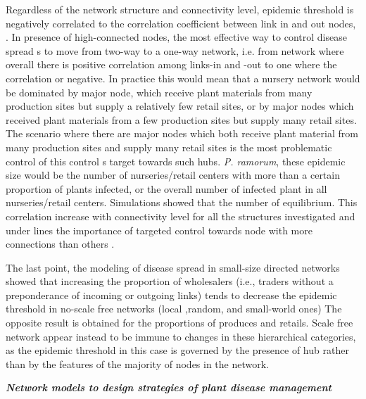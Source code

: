 Regardless of the network structure and connectivity level, epidemic threshold is negatively correlated to the correlation coefficient between link in and out nodes, . In presence of high-connected nodes, the most effective way to control disease spread s to move from two-way to a one-way network, i.e. from network where overall there is positive correlation among links-in and -out to one where the correlation or negative. In practice this would mean that a nursery network would be dominated by major node, which receive plant materials from many production sites but supply a relatively few retail sites, or by major nodes which received plant materials from a few production sites but supply many retail sites. The scenario where there are major nodes which both receive plant material from many production sites and supply many retail sites is the most problematic control of this control s target towards such hubs. \textit{P. ramorum}, these epidemic size would be the number of nurseries/retail centers with more than a certain proportion of plants infected, or the overall number of infected plant in all nurseries/retail centers. Simulations showed that the number of equilibrium. This correlation increase with connectivity level for all the structures investigated and under lines the importance of targeted control towards node with more connections than others . 

The last point, the modeling of disease spread in small-size directed networks showed that increasing the proportion of wholesalers (i.e., traders without a preponderance of incoming or outgoing links) tends to decrease the epidemic threshold in no-scale free networks (local ,random, and small-world ones) The opposite result is obtained for the proportions of produces and retails. Scale free network appear instead to be immune to changes in these hierarchical categories, as the epidemic threshold in this case is governed by the presence of hub rather than by the features of the majority of nodes in the network.

\textit{\textbf{Network models to design strategies of plant disease management}}

